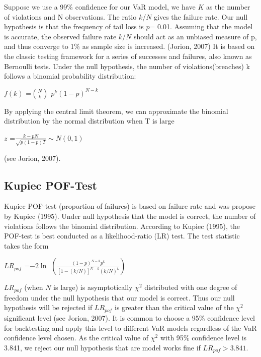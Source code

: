 \documentclass[a4paper,11pt,oneside]{book}
\begin{document}
Suppose we use a 99\% confidence for our VaR model, we have $K$ as the number of violations and N observations. The ratio $k$/$N$ gives the failure rate. Our null hypothesis is that the frequency of tail loss is $p$= 0.01. Assuming that the model is accurate, the observed failure rate $k$/$N$
should act as an unbiased measure of p, and thus converge to 1\% as sample size is
increased. (Jorion, 2007) \newline\newline
It is based on the classic testing framework for a series of successes and failures, also known as Bernoulli tests. Under the null hypothesis, the number of violations(breaches) k follows a binomial probability distribution:
\begin{center}
	$f(k)$ =$N \choose {k}$ $p^{k}(1-p)^{N-k}$ 
\end{center}

By applying the central limit theorem, we can approximate the binomial distribution by the normal distribution when T is large
\begin{center}
	$z$ =$\frac{k-pN}{\sqrt{p(1-p)T}}\sim N(0,1)$ 
\end{center}
(see Jorion, 2007).\newline

\subsection{Kupiec POF-Test}
Kupiec POF-test (proportion of failures) is based on failure rate and was propose by Kupiec (1995). Under null
hypothesis that the model is correct, the number of violations follows the
binomial distribution. According to Kupiec
(1995), the POF-test is best conducted as a likelihood-ratio (LR) test. The test
statistic takes the form
\begin{center}
	$LR_{pof}$ =$-2\ln$ $\left(\frac{(1-p)^{N-k}p^k}{[1-(k/N)]^{N-k}(k/N)^k}\right)$
\end{center}
$LR_{pof}$ (when $N$ is large) is asymptotically $\chi^2$ distributed with one degree of freedom under the null hypothesis that our model is correct. Thus our null hypothesis will be rejected if $LR_{pof}$ is greater than the critical value of the $\chi^2$ significant level (see Jorion, 2007). It is common to choose a 95\% confidence level for backtesting and apply this level to different VaR models regardless of the VaR confidence level chosen. As the critical value of $\chi^2$ with 95\% confidence level is 3.841, we reject our null hypothesis that are model works fine if $LR_{pof} > 3.841$.
\newline
\end{document}
